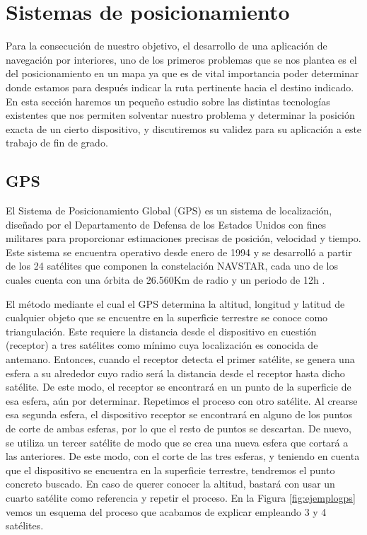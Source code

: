 \section{Sistemas de posicionamiento}
Para la consecución de nuestro objetivo, el desarrollo de una aplicación de navegación por interiores, uno de los primeros problemas que se nos plantea es el del posicionamiento en un mapa ya que es de vital importancia poder determinar donde estamos para después indicar la ruta pertinente hacia el destino indicado. En esta sección haremos un pequeño estudio sobre las distintas tecnologías existentes que nos permiten solventar nuestro problema y determinar la posición exacta de un cierto dispositivo, y discutiremos su validez para su aplicación a este trabajo de fin de grado.

\subsection{GPS}

El Sistema de Posicionamiento Global (GPS) es un sistema de localización, diseñado por el Departamento de
Defensa de los Estados Unidos con fines militares para proporcionar estimaciones precisas de posición,
velocidad y tiempo. Este sistema se encuentra operativo desde enero de 1994 y se desarrolló a partir de los 24 satélites que componen la constelación NAVSTAR, cada uno de los cuales cuenta con una órbita de 26.560Km de radio y un periodo de 12h \citep{pozo2000sistema}. 

El método mediante el cual el GPS determina la altitud, longitud y latitud de cualquier objeto que se encuentre en la superficie terrestre se conoce como triangulación. Este requiere la distancia desde el dispositivo en cuestión (receptor) a tres satélites como mínimo cuya localización es conocida de antemano. Entonces, cuando el receptor detecta el primer satélite, se genera una esfera a su alrededor cuyo radio será la distancia desde el receptor hasta dicho satélite. De este modo, el receptor se encontrará en un punto de la superficie de esa esfera, aún por determinar. Repetimos el proceso con otro satélite. Al crearse esa segunda esfera, el dispositivo receptor se encontrará en alguno de los puntos de corte de ambas esferas, por lo que el resto de puntos se descartan. De nuevo, se utiliza un tercer satélite de modo que se crea una nueva esfera que cortará a las
anteriores. De este modo, con el corte de las tres esferas, y teniendo en cuenta que el dispositivo se encuentra en la superficie terrestre, tendremos el punto concreto buscado. En caso de querer conocer la altitud, bastará con usar un cuarto satélite como referencia y repetir el proceso. En la Figura \ref{fig:ejemplogps} vemos un esquema del proceso que acabamos de explicar empleando 3 y 4 satélites.

